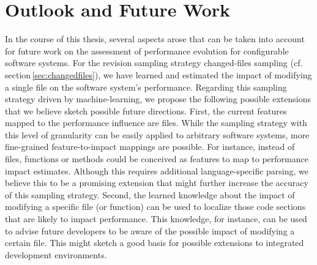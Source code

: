 \section{Outlook and Future Work}
In the course of this thesis, several aspects arose that can be taken into
account for future work on the assessment of performance evolution for
configurable software systems. For the revision sampling strategy changed-files
sampling (cf. section\,\ref{sec:changedfiles}), we have learned and estimated
the impact of modifying a single file on the software system’s performance. Regarding this
sampling strategy driven by machine-learning, we propose the following possible
extensions that we believe sketch possible future directions. First, the
current features mapped to the performance influence are files. While the
sampling strategy with this level of granularity can be easily applied to
arbitrary software systems, more fine-grained feature-to-impact mappings are
possible. For instance, instead of files, functions or methods could be
conceived as features to map to performance impact estimates. Although this
requires additional  language-specific parsing, we believe this to be a
promising extension that might further increase the accuracy of this sampling
strategy. Second, the learned knowledge about the impact of modifying a
specific file (or function) can be used to localize those code sections that
are likely to impact performance. This knowledge, for instance, can be used to
advise future developers to be aware of the possible impact of modifying a
certain file. This might sketch a good basis for possible extensions to
integrated development environments.
